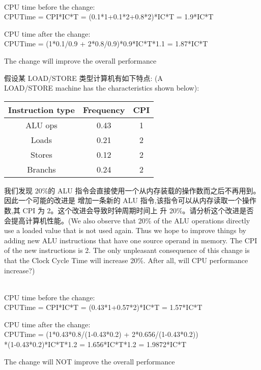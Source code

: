 \documentclass[a4paper, 12pt, addpoints, answers]{exam}
\begin{document}
\begin{questions}
\begin{solution}
{ } \\
CPU time before the change:  \\
\centering CPUTime = CPI*IC*T = (0.1*1+0.1*2+0.8*2)*IC*T = 1.9*IC*T   \\
\raggedright CPU time after the change: \\
\centering CPUTime = (1*0.1/0.9 + 2*0.8/0.9)*0.9*IC*T*1.1 = 1.87*IC*T   \\
\raggedright The change will improve the overall performance
\end{solution}

\question[10]
假设某 LOAD/STORE 类型计算机有如下特点: (A \\ LOAD/STORE machine has the characteristics
shown below):

\begin{center}
  \begin{tabular}{ | c | c | c | }
    \hline
    Instruction type & Frequency & CPI \\ \hline
    ALU ops & 0.43 & 1 \\ \hline
    Loads & 0.21 & 2 \\ \hline
    Stores & 0.12 & 2 \\ \hline
    Branchs & 0.24 & 2 \\
    \hline
  \end{tabular}
\end{center}

我们发现 20\%的 ALU 指令会直接使用一个从内存装载的操作数而之后不再用到。因此一个可能的改进是
增加一条新的 ALU 指令,该指令可以从内存读取一个操作数,其 CPI 为 2。这个改进会导致时钟周期时间上
升 20\%。请分析这个改进是否会提高计算机性能。(We also observe that 20\% of the ALU operations directly use a
loaded value that is not used again. Thus we hope to improve things by adding new ALU instructions that have one
source operand in memory. The CPI of the new instructions is 2. The only unpleasant consequence of this change is
that the Clock Cycle Time will increase 20\%. After all, will CPU performance increase?)


\begin{solution}
{ } \\
CPU time before the change:  \\
\centering CPUTime = CPI*IC*T = (0.43*1+0.57*2)*IC*T = 1.57*IC*T   \\
\raggedright CPU time after the change: \\
\centering CPUTime = (1*0.43*0.8/(1-0.43*0.2) + 2*0.656/(1-0.43*0.2)) \\
*(1-0.43*0.2)*IC*T*1.2 = 1.656*IC*T*1.2 = 1.9872*IC*T   \\
\raggedright The change will NOT improve the overall performance
\end{solution}


\end{questions}
\end{document}
